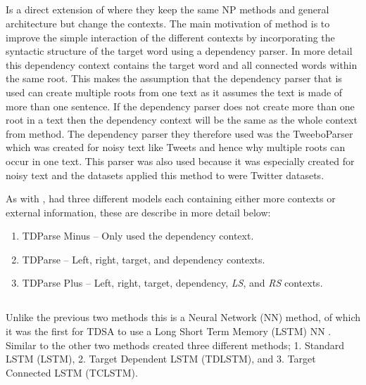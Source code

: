 \subsection{\cite{repro_wang_2017}}
Is a direct extension of \cite{repro_vo_2015} where they keep the same NP methods and general architecture but change the contexts. The main motivation of \citet{repro_wang_2017} method is to improve the simple interaction of the different contexts by incorporating the syntactic structure of the target word using a dependency parser. In more detail this dependency context contains the target word and all connected words within the same root. This makes the assumption that the dependency parser that is used can create multiple roots from one text as it assumes the text is made of more than one sentence. If the dependency parser does not create more than one root in a text then the dependency context will be the same as the whole context from \citet{repro_vo_2015} method. The dependency parser they therefore used was the TweeboParser \citep{repro_kong_2014} which was created for noisy text like Tweets and hence why multiple roots can occur in one text. This parser was also used because it was especially created for noisy text and the datasets \citet{repro_wang_2017} applied this method to were Twitter datasets.

As with \citet{repro_vo_2015}, \citet{repro_wang_2017} had three different models each containing either more contexts or external information, these are describe in more detail below:
\begin{enumerate}
    \item TDParse Minus -- Only used the dependency context.
    \item TDParse -- Left, right, target, and dependency contexts.
    \item TDParse Plus -- Left, right, target, dependency, \textit{LS}, and \textit{RS} contexts.
\end{enumerate}

\subsection{\cite{repro_tang_2016}}
Unlike the previous two methods this is a Neural Network (NN) method, of which it was the first for TDSA to use a Long Short Term Memory (LSTM) NN \citep{repro_hochreiter_1997}. Similar to the other two methods \citet{repro_tang_2016} created three different methods; 1. Standard LSTM (LSTM), 2. Target Dependent LSTM (TDLSTM), and 3. Target Connected LSTM (TCLSTM).\\


